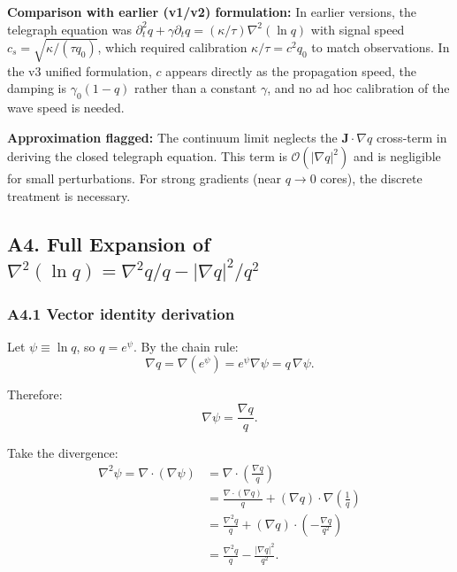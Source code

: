 \documentclass[reprint]{revtex4-2}
\begin{document}
\textbf{Comparison with earlier (v1/v2) formulation:} In earlier versions, the telegraph equation was $\partial_t^2 q + \gamma\partial_t q = (\kappa/\tau)\nabla^2(\ln q)$ with signal speed $c_s = \sqrt{\kappa/(\tau q_0)}$, which required calibration $\kappa/\tau = c^2 q_0$ to match observations. In the v3 unified formulation, $c$ appears directly as the propagation speed, the damping is $\gamma_0(1-q)$ rather than a constant $\gamma$, and no ad hoc calibration of the wave speed is needed.

\textbf{Approximation flagged:} The continuum limit neglects the $\mathbf{J}\cdot\nabla q$ cross-term in deriving the closed telegraph equation. This term is $\mathcal{O}(|\nabla q|^2)$ and is negligible for small perturbations. For strong gradients (near $q\to 0$ cores), the discrete treatment is necessary.

\subsection{A4. Full Expansion of $\nabla^2(\ln q) = \nabla^2 q/q - |\nabla q|^2/q^2$}

\subsubsection{A4.1 Vector identity derivation}

Let $\psi \equiv \ln q$, so $q = e^\psi$. By the chain rule:
\begin{equation}
\nabla q = \nabla(e^\psi) = e^\psi \nabla\psi = q\,\nabla\psi.
\end{equation}

Therefore:
\begin{equation}
\nabla\psi = \frac{\nabla q}{q}.
\end{equation}

Take the divergence:
\begin{align}
\nabla^2\psi = \nabla\cdot(\nabla\psi) &= \nabla\cdot\left(\frac{\nabla q}{q}\right)\\
&= \frac{\nabla\cdot(\nabla q)}{q} + (\nabla q)\cdot\nabla\left(\frac{1}{q}\right)\\
&= \frac{\nabla^2 q}{q} + (\nabla q)\cdot\left(-\frac{\nabla q}{q^2}\right)\\
&= \frac{\nabla^2 q}{q} - \frac{|\nabla q|^2}{q^2}.
\end{align}
\end{document}

